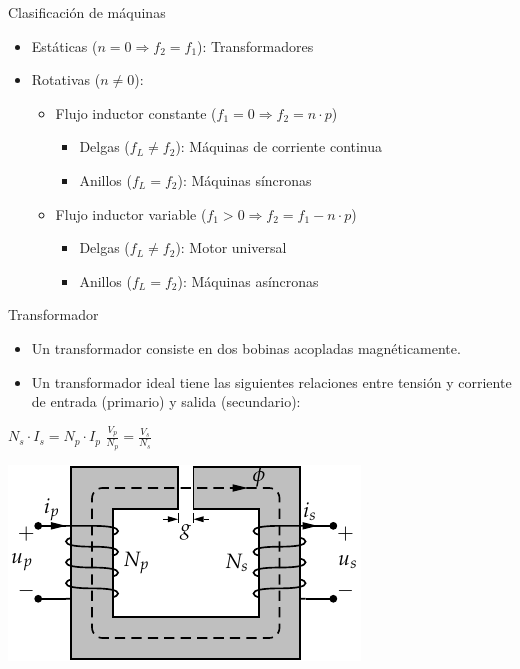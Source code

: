 \documentclass[xcolor={usenames,svgnames,dvipsnames}]{beamer}
\begin{document}
\begin{frame}[label={sec:org314e054}]{Clasificación de máquinas}
\begin{itemize}
\item Estáticas (\(n=0\Rightarrow f_{2}=f_{1}\)): Transformadores

\item Rotativas (\(n\neq0\)):

\begin{itemize}
\item Flujo inductor constante (\(f_{1}=0\Rightarrow f_{2}=n\cdot
            p\))

\begin{itemize}
\item Delgas (\(f_{L}\neq f_{2}\)): Máquinas de corriente continua

\item Anillos (\(f_{L}=f_{2}\)): Máquinas síncronas
\end{itemize}

\item Flujo inductor variable (\(f_{1}>0\Rightarrow
            f_{2}=f_{1}-n\cdot p\))

\begin{itemize}
\item Delgas (\(f_{L}\neq f_{2}\)): Motor universal

\item Anillos (\(f_{L}=f_{2}\)): Máquinas asíncronas
\end{itemize}
\end{itemize}
\end{itemize}
\end{frame}

\begin{frame}[label={sec:orga835cca}]{Transformador}
\begin{itemize}
\item Un transformador consiste en dos bobinas acopladas magnéticamente.

\item Un transformador ideal tiene las siguientes relaciones entre tensión
y corriente de entrada (primario) y salida (secundario):
\end{itemize}

\(N_{s}\cdot I_{s}=N_{p}\cdot I_{p}\)
\(\frac{V_{p}}{N_{p}}=\frac{V_{s}}{N_{s}}\)

\begin{center}
\includegraphics[height=0.3\textheight]{../figs/Transformador2.pdf}
\end{center}
\end{frame}
\end{document}
